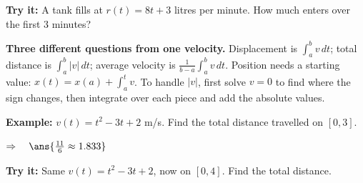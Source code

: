 \documentclass[12pt]{article}
\begin{document}
\begin{tryitbox}
\textbf{Try it:} \quad A tank fills at $r(t) = 8t + 3$ litres per minute. How much enters over the first $3$ minutes?\\[2pt]
\end{tryitbox}


\begin{formulabox}
\textbf{Three different questions from one velocity.} Displacement is $\int_a^b v\,dt$; total distance is $\int_a^b |v|\,dt$; average velocity is $\frac{1}{b-a}\int_a^b v\,dt$. Position needs a starting value: $x(t) = x(a) + \int_a^t v$. To handle $|v|$, first solve $v = 0$ to find where the sign changes, then integrate over each piece and add the absolute values.
\end{formulabox}

\begin{examplebox}
\textbf{Example:} \quad $v(t) = t^2 - 3t + 2$ m/s. Find the total distance travelled on $[0,3]$.

$\Rightarrow\quad \ans{\frac{11}{6} \approx 1.833}$
\end{examplebox}

\begin{tryitbox}
\textbf{Try it:} \quad Same $v(t) = t^2 - 3t + 2$, now on $[0,4]$. Find the total distance.\\[2pt]
\end{tryitbox}
\end{document}
